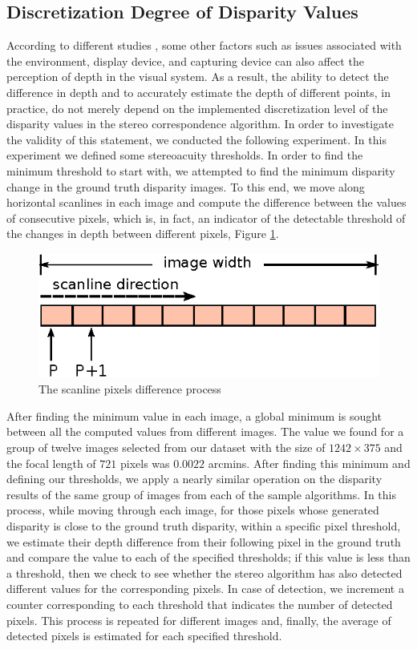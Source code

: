 \subsection{Discretization Degree of Disparity Values}
According to different studies \cite{dras96, kru10,azuma01}, some other factors such as issues associated with the environment, display device, and capturing device
can also affect the perception of depth in the visual system. As a result, the ability to detect the difference in depth and to accurately estimate the
depth of different points, in practice,
do not merely depend on the implemented discretization level of the disparity values in the stereo correspondence algorithm.
In order to investigate the validity of this statement, we conducted the following experiment. In this experiment we defined some stereoacuity thresholds. 
In order to find the minimum threshold to start with, we attempted to find the 
minimum disparity change in the ground truth disparity images. To this end, we move along horizontal scanlines in each image and 
compute the difference between the values of consecutive pixels, which is, in fact, an indicator of the detectable threshold of the changes in depth between
different pixels, Figure \ref{fig:scanline}. 

\begin{figure}[H]
\centering
\includegraphics{scanline}
\caption{The scanline pixels difference process}
\label{fig:scanline}
\end{figure} 

After finding the minimum value in each image, a global minimum is sought between all the computed values from different images.
The value we found for a group of twelve images selected from our dataset with the size of $1242\times375$ and the focal length of $721$ 
pixels was $0.0022$ arcmins.
After finding this minimum and defining our thresholds, we apply a nearly similar operation on the disparity results of the same group of images 
from each of the sample algorithms.
In this process, while moving through each image, for those pixels whose generated disparity is close to the ground truth disparity, 
within a specific pixel threshold, 
we estimate their depth difference from their following pixel
in the ground truth and compare the value to each of the specified thresholds; if this value is less than a threshold, then we check to see whether
the stereo algorithm has also detected different values for the corresponding pixels. 
In case of detection, we increment a counter corresponding to each threshold that indicates the number of detected pixels.
This process is repeated for different images and, finally, the average of detected pixels is estimated for each specified threshold.

